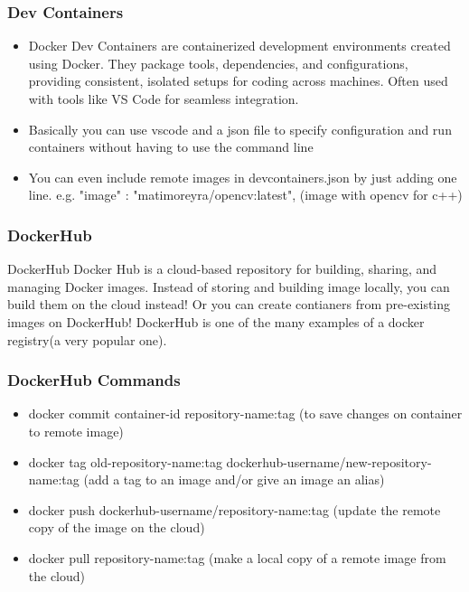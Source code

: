 \documentclass{beamer}
\begin{document}
\begin{frame}\frametitle{Dev Containers}
\begin{itemize}
\item Docker Dev Containers are containerized development environments created 
using Docker. They package tools, dependencies, and configurations, providing
consistent, isolated setups for coding across machines. Often used with tools
like VS Code for seamless integration.
\item Basically you can use vscode and a json file to specify configuration and run containers 
without having to use the command line
\item You can even include remote images in devcontainers.json
by just adding one line. e.g. "image" : "matimoreyra/opencv:latest", (image with opencv for c++)
\end{itemize}
\end{frame}


\begin{frame}\frametitle{DockerHub}
\begin{block}{DockerHub}
Docker Hub is a cloud-based repository for building, sharing, and managing Docker images. 
Instead of storing and building image locally, you can build them on the cloud instead!
Or you can create contianers from pre-existing images on DockerHub! DockerHub is one of the 
many examples of a docker registry(a very popular one). 
\end{block}
\end{frame}


\begin{frame}\frametitle{DockerHub Commands}
\begin{itemize}
\item docker commit container-id repository-name:tag (to save changes on container to remote image)
\item docker tag old-repository-name:tag dockerhub-username/new-repository-name:tag (add a tag to an image and/or give an image an alias)
\item docker push dockerhub-username/repository-name:tag (update the remote copy of the image on the cloud)
\item docker pull repository-name:tag (make a local copy of a remote image from the cloud)
\end{itemize}
\end{frame}
\end{document}
